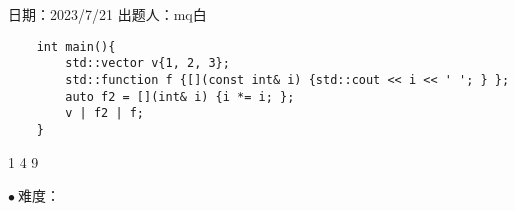 日期：2023/7/21 出题人：mq白

\begin{verbatim}
    int main(){
        std::vector v{1, 2, 3};
        std::function f {[](const int& i) {std::cout << i << ' '; } };
        auto f2 = [](int& i) {i *= i; };
        v | f2 | f;
    }
\end{verbatim}

\begin{tcolorbox}[title = {要求运行结果},
    fonttitle = \bfseries, fontupper = \sffamily, fontlower = \itshape]
    1 4 9
\end{tcolorbox}

$\bullet ~ $难度：    
